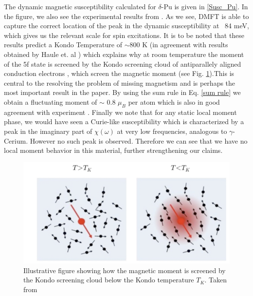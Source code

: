 \documentclass[10pt]{ruthesis}
\begin{document}
{The dynamic magnetic susceptibility calculated for $\delta$-Pu is given in \ref{Susc_Pu}. In the figure, we also see the experimental results from \cite{Me_Pu}. As we see, DMFT is able to capture the correct location of the peak in the dynamic susceptibility at ~84 meV, which gives us the relevant scale for spin excitations. It is to be noted that these results predict a Kondo Temperature of $\sim$800 K (in agreement with results obtained by Haule et. al \cite{Haule_Pu} )  which explains why at room temperature the moment of the 5f state is screened by the Kondo screening cloud of antiparallely aligned conduction electrons , which screen the magnetic moment (see Fig. \ref{Kondo_fig}).This is central to the resolving the problem of missing magnetism and is perhaps the most important result in the paper. By using the sum rule in Eq. \ref{sum rule} we obtain a fluctuating moment of $\sim$ 0.8 $\mu_B$ per atom which is also in good agreement with experiment \cite{Me_Pu}. Finally we note that for any static local moment phase, we would have seen a Curie-like susceptibility which is characterized by a peak in the imaginary part of $\chi(\omega)$ at very low frequencies, analogous to $\gamma$-Cerium. However no such peak is observed. Therefore we can see that we have no local moment behavior in this material, further strengthening our claims.

\begin{figure}[H]
\begin{center}
\includegraphics[width=\columnwidth]{Kondo_Pu.jpg}
\caption{ Illustrative figure showing how the magnetic moment is screened by the Kondo screening cloud below the Kondo temperature $T_K$. Taken from \cite{Me_Pu} \label{Kondo_fig}}
\end{center}

\end{figure}

}
\end{document}
